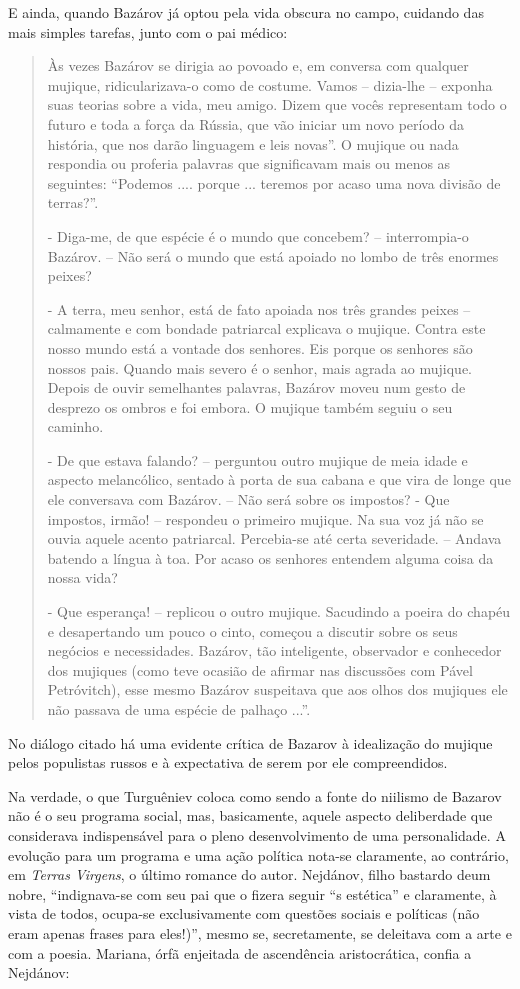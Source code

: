 E ainda, quando Bazárov já optou pela vida obscura no campo, cuidando
das mais simples tarefas, junto com o pai médico:

\begin{quote}
Às vezes Bazárov se dirigia ao povoado e, em conversa com qualquer
mujique, ridicularizava-o como de costume. Vamos -- dizia-lhe -- exponha
suas teorias sobre a vida, meu amigo. Dizem que vocês representam todo o
futuro e toda a força da Rússia, que vão iniciar um novo período da
história, que nos darão linguagem e leis novas''. O mujique ou nada
respondia ou proferia palavras que significavam mais ou menos as
seguintes: ``Podemos .... porque ... teremos por acaso uma nova divisão
de terras?''.

- Diga-me, de que espécie é o mundo que concebem? -- interrompia-o
Bazárov. -- Não será o mundo que está apoiado no lombo de três enormes
peixes?

- A terra, meu senhor, está de fato apoiada nos três grandes peixes --
calmamente e com bondade patriarcal explicava o mujique. Contra este
nosso mundo está a vontade dos senhores. Eis porque os senhores são
nossos pais. Quando mais severo é o senhor, mais agrada ao mujique.
Depois de ouvir semelhantes palavras, Bazárov moveu num gesto de
desprezo os ombros e foi embora. O mujique também seguiu o seu caminho.

- De que estava falando? -- perguntou outro mujique de meia idade e
aspecto melancólico, sentado à porta de sua cabana e que vira de longe
que ele conversava com Bazárov. -- Não será sobre os impostos? - Que
impostos, irmão! -- respondeu o primeiro mujique. Na sua voz já não se
ouvia aquele acento patriarcal. Percebia-se até certa severidade. --
Andava batendo a língua à toa. Por acaso os senhores entendem alguma
coisa da nossa vida?

- Que esperança! -- replicou o outro mujique. Sacudindo a poeira do
chapéu e desapertando um pouco o cinto, começou a discutir sobre os seus
negócios e necessidades. Bazárov, tão inteligente, observador e
conhecedor dos mujiques (como teve ocasião de afirmar nas discussões com
Pável Petróvitch), esse mesmo Bazárov suspeitava que aos olhos dos
mujiques ele não passava de uma espécie de palhaço ...''.
\end{quote}

No diálogo citado há uma evidente crítica de Bazarov à idealização do
mujique pelos populistas russos e à expectativa de serem por ele
compreendidos.

Na verdade, o que Turguêniev coloca como sendo a fonte do niilismo de
Bazarov não é o seu programa social, mas, basicamente, aquele aspecto
deliberdade que considerava indispensável para o pleno desenvolvimento
de uma personalidade. A evolução para um programa e uma ação política
nota-se claramente, ao contrário, em \emph{Terras Virgens}, o último
romance do autor. Nejdánov, filho bastardo deum nobre, ``indignava-se
com seu pai que o fizera seguir ``s estética'' e claramente, à vista de
todos, ocupa-se exclusivamente com questões sociais e políticas (não
eram apenas frases para eles!)'', mesmo se, secretamente, se deleitava
com a arte e com a poesia. Mariana, órfã enjeitada de ascendência
aristocrática, confia a Nejdánov:

